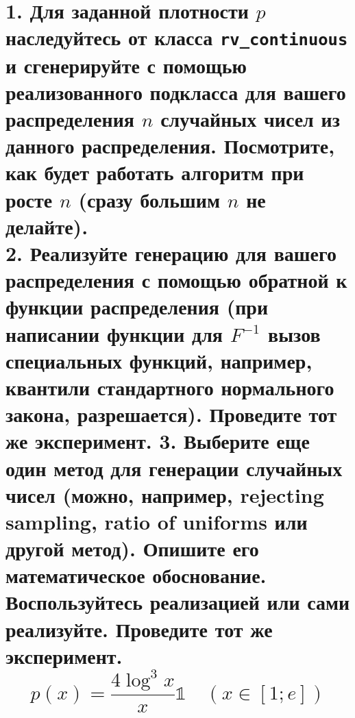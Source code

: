 \documentclass{report}
\begin{document}
\chapter{
1. Для заданной плотности $p$ наследуйтесь от класса \texttt{rv\_continuous}
 и сгенерируйте с помощью реализованного подкласса для вашего распределения
 $n$ случайных чисел из данного распределения.
 Посмотрите, как будет работать алгоритм при росте $n$ (сразу большим $n$ не делайте). \\
 2. Реализуйте генерацию для вашего распределения с помощью обратной к функции распределения
 (при написании функции для $F^{-1}$ вызов специальных функций, например, квантили стандартного нормального закона, разрешается). Проведите тот же эксперимент.
 3. Выберите еще один метод для генерации случайных чисел (можно, например, rejecting sampling,
 ratio of uniforms или другой метод). Опишите его математическое обоснование.
 Воспользуйтесь реализацией или сами реализуйте. Проведите тот же эксперимент.
\[
    p(x)=\frac{4 \log^3 x}{x} \mathbb{1} \quad \left(x\in\left[1;e\right]\right)
\]
}
\end{document}
